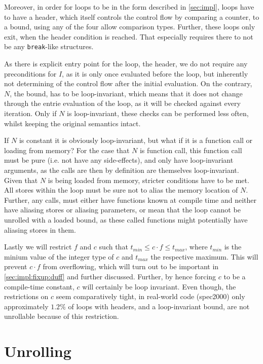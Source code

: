 Moreover, in order for loops to be in the form described in \cref{sec:impl}, loops have to have a header, which itself controls the control flow by comparing a counter, to a bound, using any of the four allow comparison types.
Further, these loops only exit, when the header condition is reached.
That especially requires there to not be any \texttt{break}-like structures.

As there is explicit entry point for the loop, the header, we do not require any preconditions for $I$, as it is only once evaluated before the loop, but inherently not determining of the control flow after the initial evaluation.
On the contrary, $N$, the bound, has to be loop-invariant, which means that it does not change through the entrie evaluation of the loop, as it will be checked against every iteration.
Only if $N$ is loop-invariant, these checks can be performed less often, whilst keeping the original semantics intact.

If $N$ is constant it is obviously loop-invariant, but what if it is a function call or loading from memory?
For the case that $N$ is function call, this function call must be pure (i.e. not have any side-effects), and only have loop-invariant arguments, as the calls are then by definition are themselves loop-invariant.
Given that $N$ is being loaded from memory, stricter conditions have to be met.
All stores within the loop must be sure not to alias the memory location of $N$.
Further, any calls, must either have functions known at compile time and neither have aliasing stores or aliasing parameters, or mean that the loop cannot be unrolled with a loaded bound, as these called functions might potentially have aliasing stores in them.

Lastly we will restrict $f$ and $c$ such that $t_{min} \leq c \cdot f \leq t_{max}$, where $t_{min}$ is the minium value of the integer type of $c$ and $t_{max}$ the respective maximum.
This will prevent $c \cdot f$ from overflowing, which will turn out to be important in \cref{sec:impl:fixup:duff} and further discussed.
Further, by hence forcing $c$ to be a compile-time constant, $c$ will certainly be loop invariant.
Even though, the restrictions on $c$ seem comparatively tight, in real-world code (spec2000) only approximately $1.2\%$ of loops with headers, and a loop-invariant bound, are not unrollable because of this restriction.


\section{Unrolling}\label{sec:impl:unroll}

